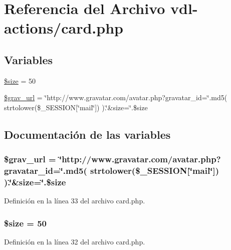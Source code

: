 \hypertarget{vdl-actions_2card_8php}{\section{Referencia del Archivo vdl-\/actions/card.php}
\label{vdl-actions_2card_8php}
}
\subsection*{Variables}
\begin{DoxyCompactItemize}
\item 
\hyperlink{vdl-actions_2card_8php_af594986e4618a8d6a5d7566617f583c6}{\$size} = 50
\item 
\hyperlink{vdl-actions_2card_8php_a8f6f86f02d6c4e5a35cdd814cd2de4e5}{\$grav\-\_\-url} = \char`\"{}http\-://www.\-gravatar.\-com/avatar.\-php?gravatar\-\_\-id=\char`\"{}.md5( strtolower(\$\-\_\-\-S\-E\-S\-S\-I\-O\-N\mbox{[}\char`\"{}mail\char`\"{}\mbox{]}) ).\char`\"{}\&size=\char`\"{}.\$size
\end{DoxyCompactItemize}


\subsection{Documentación de las variables}
\hypertarget{vdl-actions_2card_8php_a8f6f86f02d6c4e5a35cdd814cd2de4e5}{
\subsubsection[{\$grav\-\_\-url}]{\setlength{\rightskip}{0pt plus 5cm}\$grav\-\_\-url = \char`\"{}http\-://www.\-gravatar.\-com/avatar.\-php?gravatar\-\_\-id=\char`\"{}.md5( strtolower(\$\-\_\-\-S\-E\-S\-S\-I\-O\-N\mbox{[}\char`\"{}mail\char`\"{}\mbox{]}) ).\char`\"{}\&size=\char`\"{}.\$size}}\label{vdl-actions_2card_8php_a8f6f86f02d6c4e5a35cdd814cd2de4e5}


Definición en la línea 33 del archivo card.\-php.

\hypertarget{vdl-actions_2card_8php_af594986e4618a8d6a5d7566617f583c6}{
\subsubsection[{\$size}]{\setlength{\rightskip}{0pt plus 5cm}\$size = 50}}\label{vdl-actions_2card_8php_af594986e4618a8d6a5d7566617f583c6}


Definición en la línea 32 del archivo card.\-php.

